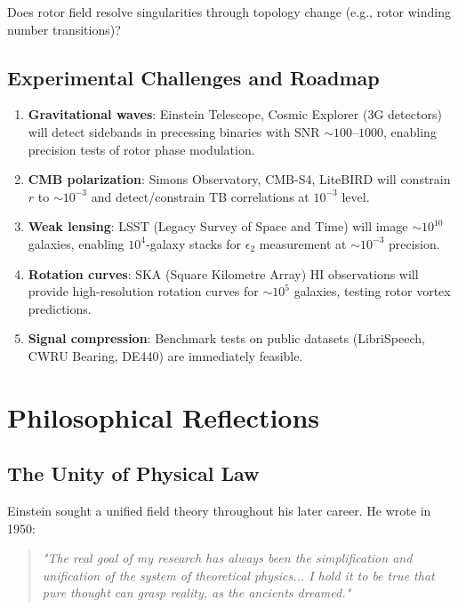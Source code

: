 \documentclass[11pt,a4paper]{article}
\numberwithin{equation}{section}
\theoremstyle{plain}
\theoremstyle{definition}
\theoremstyle{remark}
\begin{document}
Does rotor field resolve singularities through topology change (e.g., rotor winding number transitions)?

\subsection{Experimental Challenges and Roadmap}

\begin{enumerate}
\item \textbf{Gravitational waves}: Einstein Telescope, Cosmic Explorer (3G detectors) will detect sidebands in precessing binaries with SNR $\sim 100$–$1000$, enabling precision tests of rotor phase modulation.

\item \textbf{CMB polarization}: Simons Observatory, CMB-S4, LiteBIRD will constrain $r$ to $\sim 10^{-3}$ and detect/constrain TB correlations at $10^{-3}$ level.

\item \textbf{Weak lensing}: LSST (Legacy Survey of Space and Time) will image $\sim 10^{10}$ galaxies, enabling $10^4$-galaxy stacks for $\epsilon_2$ measurement at $\sim 10^{-3}$ precision.

\item \textbf{Rotation curves}: SKA (Square Kilometre Array) HI observations will provide high-resolution rotation curves for $\sim 10^5$ galaxies, testing rotor vortex predictions.

\item \textbf{Signal compression}: Benchmark tests on public datasets (LibriSpeech, CWRU Bearing, DE440) are immediately feasible.
\end{enumerate}

\section{Philosophical Reflections}
\label{sec:philosophy}

\subsection{The Unity of Physical Law}

Einstein sought a unified field theory throughout his later career. He wrote in 1950:

\begin{quote}
\textit{"The real goal of my research has always been the simplification and unification of the system of theoretical physics... I hold it to be true that pure thought can grasp reality, as the ancients dreamed."}
\end{quote}
\end{document}

